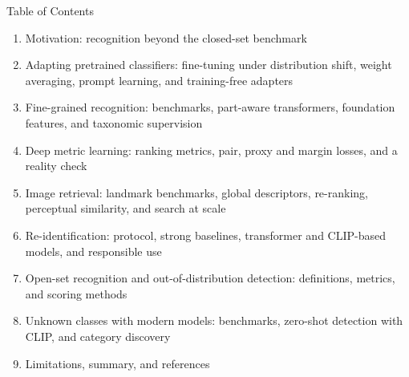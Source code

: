 \begin{frame}{Table of Contents}
  \begin{enumerate}\itemsep0.15em\footnotesize
    \item Motivation: recognition beyond the closed-set benchmark
    \item Adapting pretrained classifiers: fine-tuning under distribution shift, weight averaging, prompt learning, and training-free adapters
    \item Fine-grained recognition: benchmarks, part-aware transformers, foundation features, and taxonomic supervision
    \item Deep metric learning: ranking metrics, pair, proxy and margin losses, and a reality check
    \item Image retrieval: landmark benchmarks, global descriptors, re-ranking, perceptual similarity, and search at scale
    \item Re-identification: protocol, strong baselines, transformer and CLIP-based models, and responsible use
    \item Open-set recognition and out-of-distribution detection: definitions, metrics, and scoring methods
    \item Unknown classes with modern models: benchmarks, zero-shot detection with CLIP, and category discovery
    \item Limitations, summary, and references
  \end{enumerate}
\end{frame}
